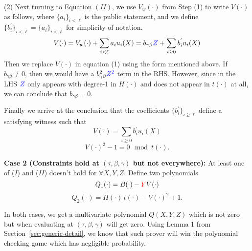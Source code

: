 \documentclass{article}
\theoremstyle{definition}
\theoremstyle{remark}
\begin{document}
(2) Next turning to Equation $(II)$, we use $V_w(\cdot)$ from Step (1) to write $V(\cdot)$ as follows, where $\{a_i\}_{i<\ell}$ is the public statement, and we define $\{b^{'}_i\}_{i<\ell}=\{a_i\}_{i<\ell}$ for simplicity of notation.
$$V(\cdot) = V_w(\cdot) + \sum_{i < \ell}a_i u_i(X) = b_{\gamma \beta}{\color{blue}Z} + \sum_{i \ge 0}b^{'}_i u_i(X)$$
Then we replace $V(\cdot)$ in equation (1) using the form mentioned above. If $b_{\gamma \beta} \neq 0$, then we would have a $b_{\gamma \beta}^2{\color{blue}Z^2}$ term in the RHS. However, since in the LHS ${\color{blue}Z}$ only appears with degree-1 in $H(\cdot)$ and does not appear in $t(\cdot)$ at all, we can conclude that $b_{\gamma \beta}=0$.

Finally we arrive at the conclusion that the coefficients $\{b^{'}_i\}_{i \ge \ell}$ define a satisfying witness such that
$$V(\cdot) = \sum_{i \ge 0}b^{'}_i u_i(X)$$ 
$$V(\cdot)^2 - 1 = 0 \mod t(\cdot).$$

\textbf{Case 2 (Constraints hold at $(\tau,\beta,\gamma)$ but not everywhere):} At least one of ($I$) and ($II$) doesn't hold for $\forall X,Y,Z$.
Define two polynomials
$$Q_1(\cdot) = B(\cdot) - {\color{red}Y} V(\cdot)$$
$$Q_2(\cdot) = H(\cdot) \, t(\cdot) -  V(\cdot)^2 + 1.$$

In both cases, we get a multivariate polynomial $Q(X,Y,Z)$ which is not zero but when evaluating at $(\tau,\beta,\gamma)$ will get zero. Using Lemma 1 from Section~\ref{sec:generic-detail}, we know that such prover will win the polynomial checking game which has negligible probability.


\end{document}
